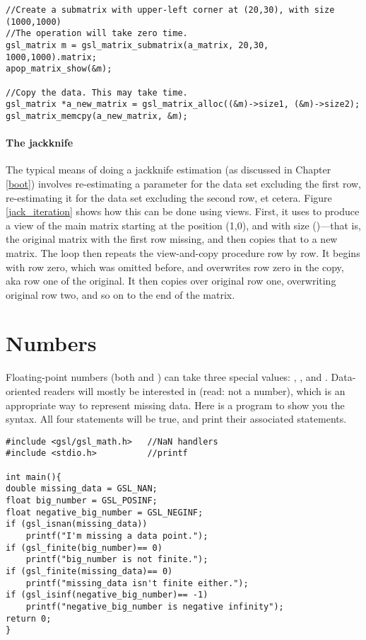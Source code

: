 \begin{lstlisting}
//Create a submatrix with upper-left corner at (20,30), with size (1000,1000)
//The operation will take zero time.
gsl_matrix m = gsl_matrix_submatrix(a_matrix, 20,30, 1000,1000).matrix;
apop_matrix_show(&m);

//Copy the data. This may take time.
gsl_matrix *a_new_matrix = gsl_matrix_alloc((&m)->size1, (&m)->size2);
gsl_matrix_memcpy(a_new_matrix, &m);
\end{lstlisting}

\paragraph{The jackknife}
The typical means of doing a jackknife estimation (as discussed in
Chapter \ref{boot}) involves re-estimating a parameter for the data set
excluding the first row, re-estimating it for the data set excluding the
second row, et cetera.  Figure \ref{jack_iteration}
shows how this can be done using views.  First, it uses
 to produce a view of the main matrix
starting at the position (1,0), and with size ()---that is, the original matrix with the first row missing,
and then copies that to a new matrix. The  loop then repeats
the view-and-copy procedure row by row.  It begins with row zero, which
was omitted before, and overwrites row zero in the copy, aka row one of
the original. It then copies over original row one, overwriting original
row two, and so on to the end of the matrix.


\section{\treesymbol Numbers}       \label{numbers}
Floating-point numbers (both  and ) can take three special values: , , and . Data-oriented readers will mostly be
interested in  (read: not a number), which is an appropriate way to represent missing data. Here is a
program to show you the syntax. All four  statements will be true, and print their associated
statements.
\begin{lstlisting}
#include <gsl/gsl_math.h>   //NaN handlers
#include <stdio.h>          //printf

int main(){
double missing_data = GSL_NAN;
float big_number = GSL_POSINF;
float negative_big_number = GSL_NEGINF;
if (gsl_isnan(missing_data))
    printf("I'm missing a data point.");
if (gsl_finite(big_number)== 0)
    printf("big_number is not finite.");
if (gsl_finite(missing_data)== 0)
    printf("missing_data isn't finite either.");
if (gsl_isinf(negative_big_number)== -1)
    printf("negative_big_number is negative infinity");
return 0;
}
\end{lstlisting}

